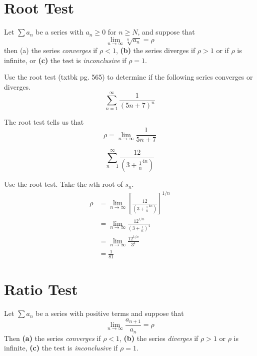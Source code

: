 \section{Root Test}

\begin{theorem}
  Let \(\sum a_n\) be a series with \( a_n \geq 0\) for \(n \geq N\), and
  suppose that
  \[ \lim_{n \to \infty} \sqrt[n]{a_n} = \rho \]
  then (a) the series \emph{converges} if \(\rho < 1 \), \textbf{(b)} the series
  diverges if \( \rho > 1\) or if \(\rho\) is infinite, or \textbf{(c)} the test
  is \emph{inconclusive} if \(\rho = 1\).
  \label{th:roottest}
\end{theorem}

\begin{ex}
  Use the root test (txtbk pg. 565) to determine if the following series converges or diverges.
  \[ \sum_{n=1}^\infty \frac{1}{\left( 5n+7 \right)^n} \]
  \begin{sol}
    The root test tells us that
    \[ \rho = \lim_{n \to \infty} \frac{1}{5n+7} \]
  \end{sol}
\end{ex}
\begin{ex}
  \[ \sum_{n=1}^{\infty} \frac{12}{\left( 3+\frac{1}{n}^{4n} \right)} \]
  \begin{sol}
    Use the root test. Take the \(n\)th root of \(s_n\).
    \begin{align*}
      \rho &= \lim_{n \to \infty} \left[ \frac{12}{ \left( 3+\frac{1}{n}^{4n} \right) }\right]^{1/n} \\
      &= \lim_{n \to \infty} \frac{12^{1/n}}{\left( 3+\frac{1}{n} \right)^4}
      \\
      &= \lim_{n \to \infty} \frac{12^{1/n}}{3^4} \\
      &= \frac{1}{81}
    \end{align*}
  \end{sol}
\end{ex}


\section{Ratio Test}

\begin{theorem}\label{th:seriesratio}
  Let $\sum a_n$ be a series with positive terms and suppose that
  \[ \lim_{n \to \infty} \frac{a_{n+1}}{a_n}=\rho \]
  Then \textbf{(a)} the series \emph{converges} if $\rho < 1$, \textbf{(b)} the
  series \emph{diverges} if $\rho > 1$ or $\rho$ is infinite, \textbf{(c)} the
  test is \emph{inconclusive} if $\rho = 1$.
\end{theorem}

